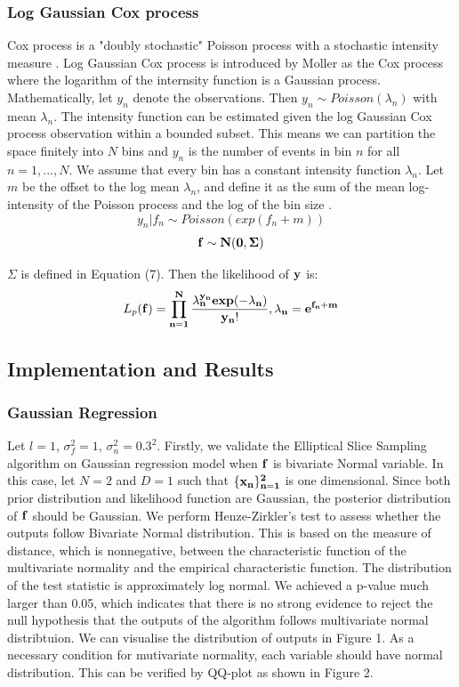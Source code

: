 \documentclass{article}
\begin{document}
\subsubsection{Log Gaussian Cox process}
  Cox process is a "doubly stochastic" Poisson process with a stochastic intensity measure \cite{Moller}. 
  Log Gaussian Cox process is introduced by Moller \cite{Moller} 
  as the Cox process where the logarithm of the internsity function is a Gaussian process. Mathematically, let $y_n$ denote the observations. Then $y_n \sim{Poisson(\lambda_n)}$ with mean $\lambda_n$. The intensity function can be estimated given the log Gaussian Cox process observation within a bounded subset. This means we can partition the space finitely into $N$ bins and $y_n$ is the number of events in bin $n$ for all $n = 1,...,N$. We assume that every bin has a constant intensity function $\lambda_n$. Let $m$ be the offset to the log mean $\lambda_n$, and define it as the sum of the mean log-intensity of the Poisson process and the log of the bin size \cite{MAM}. 
  \begin{equation}
  y_n|f_n \sim{Poisson(exp(f_n + m))}
  \end{equation}
  \begin{equation}
  \bf{f} \sim{N(0,\Sigma)}
  \end{equation}
  
  $\Sigma$ is defined in Equation (7). Then the likelihood of $\bf{y}$ is:
  \begin{equation}
  L_p(\bf{f}) = \prod_{n=1}^{N}\frac{\lambda_{n}^{y_{n}} exp(-\lambda_n)}{y_n!}, \lambda_n = e^{f_n+m}
  \end{equation}
  
\subsection{Implementation and Results}
\subsubsection{Gaussian Regression}

Let $l=1$, $\sigma_{f}^2 = 1$, $\sigma_{n}^2 = 0.3^2$. Firstly, we validate the Elliptical Slice Sampling algorithm on Gaussian regression model when $\bf{f}$ is bivariate Normal variable. In this case, let $N = 2$ and $D = 1$ such that $\{\bf{x}_n\}_{n=1}^{2}$ is one dimensional. Since both prior distribution and likelihood function are Gaussian, the posterior distribution of $\bf{f}$ should be Gaussian. We perform Henze-Zirkler's test to assess whether the outputs follow Bivariate Normal distribution. This is based on the measure of distance, which is nonnegative, between the characteristic function of the multivariate normality and the empirical characteristic function. The distribution of the test statistic is approximately log normal. We achieved a p-value much larger than 0.05, which indicates that there is no strong evidence to reject the null hypothesis that the outputs of the algorithm follows multivariate normal distribtuion. We can visualise the distribution of outputs in Figure 1. As a necessary condition for mutivariate normality, each variable should have normal distribution. This can be verified by QQ-plot as shown in Figure 2.
\end{document}
